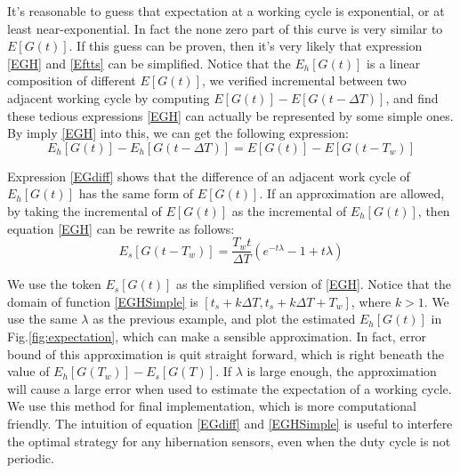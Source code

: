 \documentclass[conference]{IEEEtran}
\begin{document}
%


It's reasonable to guess that expectation at a working cycle is exponential, or at least near-exponential. In fact the none zero part of this curve is very similar to $E[G(t)]$.
If this guess can be proven, then it's very likely that expression \eqref{EGH} and \eqref{Eftts} can be simplified. Notice that the \(E_h[G(t)]\) is a linear composition of different \(E[G(t)]\), we verified incremental between two adjacent working cycle by computing  $E[G(t)]-E[G(t-\Delta T)] $, and find these tedious expressions \eqref{EGH} can actually be represented by some simple ones. By imply \eqref{EGH} into this, we can get the following expression:
\begin{equation}
E_h[G(t)]-E_h[G(t-\Delta T)]=E[G(t)]-E[G(t-T_w)]\label{EGdiff}
\end{equation}


Expression \eqref{EGdiff} shows that the difference of an adjacent work cycle of $E_h[G(t)]$ has the same form of $E[G(t)]$. If an approximation are allowed, by taking the incremental of $E[G(t)]$ as the incremental of $E_h[G(t)]$, then equation \eqref{EGH} can be rewrite as follows:
\begin{equation}
E_s[G(t-T_w)]=\frac{T_w t}{\Delta T}(e^{-t\lambda}-1+t\lambda)\label{EGHSimple}
\end{equation}


We use the token $E_s[G(t)]$ as the simplified version of \eqref{EGH}. Notice that the domain of function \eqref{EGHSimple} is $[t_s+k\Delta T, t_s+k\Delta T+T_w]$, where $k>1$. 
We use the same $\lambda$ as the previous example, and plot the estimated $E_h[G(t)]$ in Fig.\ref{fig:expectation}, which can make a sensible approximation. In fact, error bound of this approximation is quit straight forward, which is right beneath the value of $E_h[G(T_w)]-E_s[G(T)]$. If $\lambda$ is large enough, the approximation will cause a large error when used to estimate the expectation of a working cycle.
We use this method for final implementation, which is more computational friendly. 
The intuition of equation \eqref{EGdiff}  and \eqref{EGHSimple} is useful to interfere the optimal strategy for any hibernation sensors, even when the duty cycle is not periodic.
\end{document}

